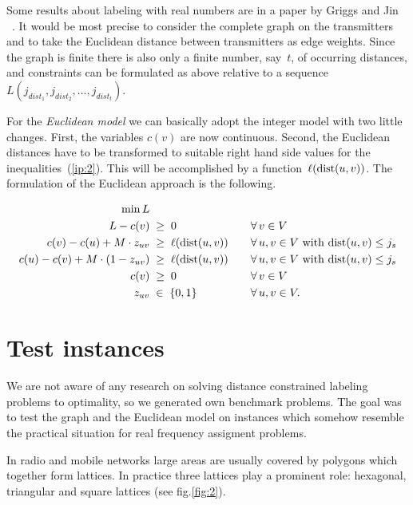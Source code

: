 \documentclass[smallextended]{svjour3}
\def\dist{\mathop{\rm dist}}
\begin{document}
Some results about labeling with real numbers are in a paper by Griggs and Jin ~\cite{13}.
It would be most precise to consider the complete graph on the
transmitters and to take the Euclidean distance between transmitters
as edge weights. Since the graph is finite there is also only a finite
number, say~$t$, of occurring distances, and constraints can be formulated as above
relative to a sequence $L(j_{dist_{1}},j_{dist_{2}},\ldots ,j_{dist_{t}})$.

For the \emph{Euclidean model} we can basically adopt the integer model
with two little changes. First, the variables $c(v)$ are now continuous.
Second, the Euclidean distances have to be transformed to suitable right hand
side values for the inequalities~(\ref{ip:2}). This will be accomplished by a
function~$\ell(\dist(u,v))$. The formulation of the Euclidean approach is the following.

\begin{alignat}{2}
\min L      &                            & \quad & \notag\\
L-c(v)       &\;\ge\;0                    & \quad &\forall\, v\in V\notag\\
c(v)-c(u)+M\cdot z_{uv}     &\;\geq\;\ell(\dist(u,v)) & \quad& \forall\, u,v\in V\text{ with }{\dist(u,v)}\le j_s\notag\\
c(u)-c(v)+M\cdot(1-z_{uv}) &\;\geq\;\ell(\dist(u,v)) &   &\forall\, u,v\in V\text{ with }{\dist(u,v)}\le j_s\notag\\
c(v)          &\;\geq\;0                  & &\forall\, v\in V \notag\\
z_{uv}                                &\;\in\;\{0,1\}              &  & \forall\, u,v\in V.\notag
\end{alignat}

\section{Test instances}

We are not aware of any research on solving distance constrained labeling problems
to optimality, so we generated own benchmark problems. The goal was to test the
graph and the Euclidean model on instances which somehow resemble the practical
situation for real frequency assigment problems.

In radio and mobile networks large areas are usually covered by polygons
which together form lattices. In practice three lattices play a prominent
role: hexagonal, triangular and square lattices (see fig.\ref{fig:2}).
\end{document}

